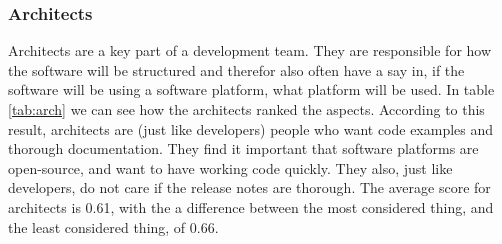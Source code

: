 \documentclass{article}
\begin{document}
\subsubsection{Architects}
Architects are a key part of a development team. They are responsible for how the software will be structured and therefor also often have a say in, if the software will be using a software platform, what platform will be used. In table \ref{tab:arch} we can see how the architects ranked the aspects. According to this result, architects are (just like developers) people who want code examples and thorough documentation. They find it important that software platforms are open-source, and want to have working code quickly. They also, just like developers, do not care if the release notes are thorough. The average score for architects is 0.61, with the a difference between the most considered thing, and the least considered thing, of 0.66.
\end{document}
